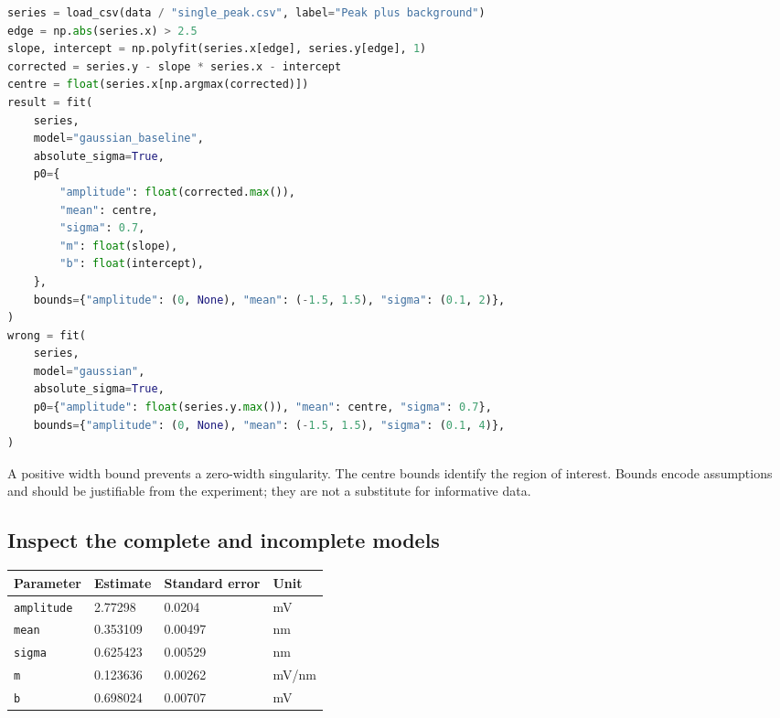 \documentclass[
  british,
  10pt,
  a4paper,
]{article}
\newcommand{\passthrough}[1]{#1}
\begin{document}
\par\noindent\begin{minipage}{\linewidth}

\begin{lstlisting}[language=Python]
series = load_csv(data / "single_peak.csv", label="Peak plus background")
edge = np.abs(series.x) > 2.5
slope, intercept = np.polyfit(series.x[edge], series.y[edge], 1)
corrected = series.y - slope * series.x - intercept
centre = float(series.x[np.argmax(corrected)])
result = fit(
    series,
    model="gaussian_baseline",
    absolute_sigma=True,
    p0={
        "amplitude": float(corrected.max()),
        "mean": centre,
        "sigma": 0.7,
        "m": float(slope),
        "b": float(intercept),
    },
    bounds={"amplitude": (0, None), "mean": (-1.5, 1.5), "sigma": (0.1, 2)},
)
wrong = fit(
    series,
    model="gaussian",
    absolute_sigma=True,
    p0={"amplitude": float(series.y.max()), "mean": centre, "sigma": 0.7},
    bounds={"amplitude": (0, None), "mean": (-1.5, 1.5), "sigma": (0.1, 4)},
)
\end{lstlisting}

\end{minipage}\par

A positive width bound prevents a zero-width singularity. The centre
bounds identify the region of interest. Bounds encode assumptions and
should be justifiable from the experiment; they are not a substitute for
informative data.


\subsection{Inspect the complete and incomplete
models}\label{inspect-the-complete-and-incomplete-models}

\begin{longtable}[]{@{}llll@{}}
\toprule\noalign{}
Parameter & Estimate & Standard error & Unit \\
\midrule\noalign{}
\endhead
\bottomrule\noalign{}
\endlastfoot
\passthrough{\lstinline!amplitude!} & 2.77298 & 0.0204 & mV \\
\passthrough{\lstinline!mean!} & 0.353109 & 0.00497 & nm \\
\passthrough{\lstinline!sigma!} & 0.625423 & 0.00529 & nm \\
\passthrough{\lstinline!m!} & 0.123636 & 0.00262 & mV/nm \\
\passthrough{\lstinline!b!} & 0.698024 & 0.00707 & mV \\
\end{longtable}
\end{document}
